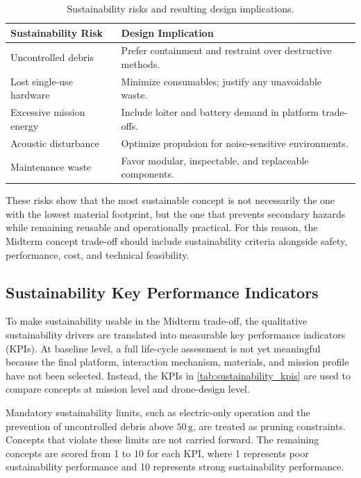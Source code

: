 \begin{table}[H]
\centering
\small
\caption{Sustainability risks and resulting design implications.}
\label{tab:sustainability_risks}
\begin{tabularx}{\textwidth}{p{4cm} X}
\toprule
\textbf{Sustainability Risk} & \textbf{Design Implication} \\
\midrule
Uncontrolled debris & Prefer containment and restraint over destructive methods. \\
Lost single-use hardware & Minimize consumables; justify any unavoidable waste. \\
Excessive mission energy & Include loiter and battery demand in platform trade-offs. \\
Acoustic disturbance & Optimize propulsion for noise-sensitive environments. \\
Maintenance waste & Favor modular, inspectable, and replaceable components. \\
\bottomrule
\end{tabularx}
\end{table}



\vspace{-10pt}
These risks show that the most sustainable concept is not necessarily the one with the lowest material footprint, but the one that prevents secondary hazards while remaining reusable and operationally practical. For this reason, the Midterm concept trade-off should include sustainability criteria alongside safety, performance, cost, and technical feasibility.

\vspace{-10pt}
\subsection{Sustainability Key Performance Indicators}
\label{sec:sustainability_kpis}

To make sustainability usable in the Midterm trade-off, the qualitative sustainability drivers are translated into measurable key performance indicators (KPIs). At baseline level, a full life-cycle assessment is not yet meaningful because the final platform, interaction mechanism, materials, and mission profile have not been selected. Instead, the KPIs in \autoref{tab:sustainability_kpis} are used to compare concepts at mission level and drone-design level.

Mandatory sustainability limits, such as electric-only operation and the prevention of uncontrolled debris above $50\,\mathrm{g}$, are treated as pruning constraints. Concepts that violate these limits are not carried forward. The remaining concepts are scored from 1 to 10 for each KPI, where 1 represents poor sustainability performance and 10 represents strong sustainability performance.


